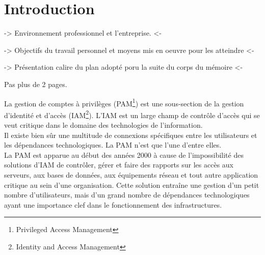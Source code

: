 \section*{Introduction} %

-> Environnement professionnel et l'entreprise. <-

-> Objectifs du travail personnel et moyens mis en oeuvre pour les atteindre <-

-> Présentation calire du plan adopté poru la suite du corps du mémoire <-

Pas plus de 2 pages.

La gestion de comptes à privilèges (PAM\footnote{Privileged Access Management}) est une sous-section de la gestion d’identité et d’accès (IAM\footnote{Identity and Access Management}). L’IAM est un large champ de contrôle d’accès qui se veut critique dans le domaine des technologies de l’information.\\
Il existe bien sûr une multitude de connexions spécifiques entre les utilisateurs et les dépendances technologiques. La PAM n’est que l’une d’entre elles.\\
La PAM est apparue au début des années 2000 à cause de l’impossibilité des solutions d’IAM de contrôler, gérer et faire des rapports sur les accès aux serveurs, aux bases de données, aux équipements réseau et tout autre application critique au sein d’une organisation. Cette solution entraîne une gestion d’un petit nombre d’utilisateurs, mais d’un grand nombre de dépendances technologiques ayant une importance clef dans le fonctionnement des infrastructures.

